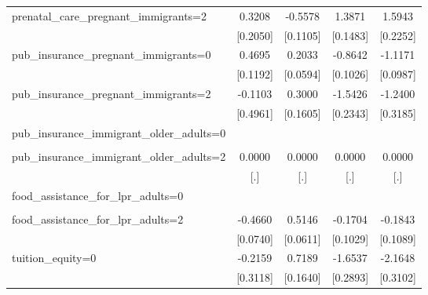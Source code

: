 \begin{table}[htbp]
\begin{tabular}{l*{4}{c}}
prenatal\_care\_pregnant\_immigrants=2&      0.3208         &     -0.5578\sym{***}&      1.3871\sym{***}&      1.5943\sym{***}\\
                    &    [0.2050]         &    [0.1105]         &    [0.1483]         &    [0.2252]         \\
\addlinespace
pub\_insurance\_pregnant\_immigrants=0&      0.4695\sym{***}&      0.2033\sym{***}&     -0.8642\sym{***}&     -1.1171\sym{***}\\
                    &    [0.1192]         &    [0.0594]         &    [0.1026]         &    [0.0987]         \\
\addlinespace
pub\_insurance\_pregnant\_immigrants=2&     -0.1103         &      0.3000\sym{*}  &     -1.5426\sym{***}&     -1.2400\sym{***}\\
                    &    [0.4961]         &    [0.1605]         &    [0.2343]         &    [0.3185]         \\
\addlinespace
pub\_insurance\_immigrant\_older\_adults=0&                     &                     &                     &                     \\
                    &                     &                     &                     &                     \\
\addlinespace
pub\_insurance\_immigrant\_older\_adults=2&      0.0000         &      0.0000         &      0.0000         &      0.0000         \\
                    &         [.]         &         [.]         &         [.]         &         [.]         \\
\addlinespace
food\_assistance\_for\_lpr\_adults=0&                     &                     &                     &                     \\
                    &                     &                     &                     &                     \\
\addlinespace
food\_assistance\_for\_lpr\_adults=2&     -0.4660\sym{***}&      0.5146\sym{***}&     -0.1704         &     -0.1843\sym{*}  \\
                    &    [0.0740]         &    [0.0611]         &    [0.1029]         &    [0.1089]         \\
\addlinespace
tuition\_equity=0    &     -0.2159         &      0.7189\sym{***}&     -1.6537\sym{***}&     -2.1648\sym{***}\\
                    &    [0.3118]         &    [0.1640]         &    [0.2893]         &    [0.3102]         \\

\end{tabular}
\end{table}
